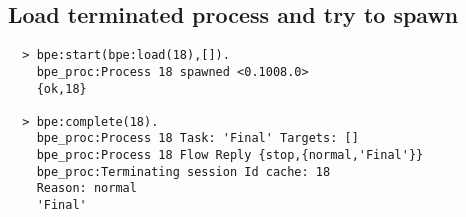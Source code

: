 \vspace{1cm}
\subsection*{Load terminated process and try to spawn}
\begin{lstlisting}
  > bpe:start(bpe:load(18),[]).
    bpe_proc:Process 18 spawned <0.1008.0>
    {ok,18}

  > bpe:complete(18).
    bpe_proc:Process 18 Task: 'Final' Targets: []
    bpe_proc:Process 18 Flow Reply {stop,{normal,'Final'}}
    bpe_proc:Terminating session Id cache: 18
    Reason: normal
    'Final'
\end{lstlisting}

